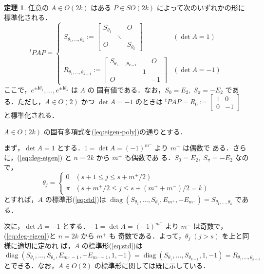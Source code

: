 \documentclass[11pt, uplatex, dvipdfmx, titlepage]{jsarticle}
\makeatletter
\renewcommand{\i}{\mathbf{i}}
\DeclareMathOperator{\diag}{diag}
\renewenvironment{proof}[1][\proofname]{\par
  \pushQED{\qed}%
  \normalfont \topsep6\p@\@plus6\p@\relax
  \trivlist
  \item[\hskip\labelsep
         \bfseries
    {#1}]\ignorespaces
}{%
  \popQED\endtrivlist\@endpefalse
}
\theoremstyle{definition}
\newtheorem{theorem}{定理}[section]
\renewcommand{\proofname}{\textbf{証明}}
\makeatother
\begin{document}
\begin{theorem}\label{thm:stdeven}
  任意の $A \in O(2k)$ はある $P \in SO(2k)$ によって次のいずれかの形に
  標準化される．
  \[
    {}^{t}P A P =\left\{
      \begin{array}{ll}
        S_{\theta_1, \ldots, \theta_k}:= \left[
        \begin{array}{ccc}
          S_{\theta_1} & & O\\
                       & \ddots &\\
          O & & S_{\theta_k}
        \end{array}
                \right] & (\det A=1)\\ \\
        R_{\theta_1, \ldots, \theta_{k-1}}:= \left[
        \begin{array}{ccc}
          S_{\theta_1, \ldots, \theta_{k-1}} & & O\\
           & 1 &\\
          O & & -1
        \end{array}
              \right] & (\det A =-1)
      \end{array}
    \right.
  \]
  ここで，$e^{\pm \i \theta_1}, \ldots, e^{\pm \i \theta_k}$ は $A$ の
  固有値である．なお，$S_0=E_2, \; S_{\pi}=-E_2$ である．ただし，$A
  \in O(2)$ かつ $\det A=-1$ のときは ${}^{t}PAP= R_0:=\left[
    \begin{array}{rr}
      1 & 0\\
      0 & -1
    \end{array}
  \right]$ と標準化される．
\end{theorem}

\begin{proof}
  $A \in O(2k)$ の固有多項式を(\ref{eq:eigen-poly})の通りとする．

  まず，$\det A =1$ とする．$1=\det A=(-1)^{m^-}$ より $m^{-}$ は偶数で
  ある．さらに，(\ref{eq:deg-eigen}) と $n=2k$ から $m^{+}$ も偶数であ
  る．$S_{0}=E_2, \; S_{\pi} = -E_2$ なので，
  \[
    \theta_j = \left\{
      \begin{array}{cl}
        0 & \left(s+1 \leq j \leq s+m^{+}/2\right)\\
        \pi & \left( s+m^{+}/2 \leq j \leq s+ (m^{+}+m^{-})/2 =k\right)
      \end{array}
    \right.
  \]
  とすれば，$A$ の標準形(\ref{eq:std})は
  $\diag(S_{\theta_1}, \ldots, S_{\theta_s}, E_{m^{+}}, -E_{m^{-}})=
  S_{\theta_1, \ldots, \theta_k}$ である．

  次に，$\det A=-1$ とする．$-1=\det A = (-1)^{m^-}$
  より $m^{-}$ は奇数で，(\ref{eq:deg-eigen})と $n=2k$ から $m^{+}$ も
  奇数である．よって，$\theta_j \; (j > s)$ を上と同様に適切に定めれ
  ば，$A$ の標準形(\ref{eq:std})は
  \[
    \diag(S_{\theta_1}, \ldots, S_{\theta_s}, E_{m^{+}-1},
    -E_{m^{-}-1}, 1, -1) = \diag( S_{\theta_1}, \ldots, S_{\theta_{k-1}}, 1, -1) = R_{\theta_1, \ldots, \theta_{k-1}}
  \]
  とできる．なお，$A \in O(2)$ の標準形に関しては既に示している．
\end{proof}
\end{document}
